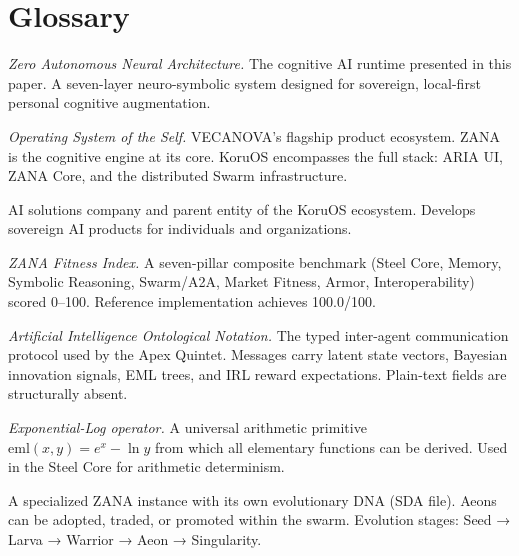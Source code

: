 \documentclass[12pt,a4paper]{article}
\begin{document}
\newpage
\section*{Glossary}

\begin{description}[leftmargin=3cm, style=nextline, font=\bfseries\color{xblue}]

  \item[ZANA]
    \emph{Zero Autonomous Neural Architecture.} The cognitive AI runtime presented
    in this paper. A seven-layer neuro-symbolic system designed for sovereign,
    local-first personal cognitive augmentation.

  \item[KoruOS]
    \emph{Operating System of the Self.} VECANOVA's flagship product ecosystem.
    ZANA is the cognitive engine at its core. KoruOS encompasses the full stack:
    ARIA UI, ZANA Core, and the distributed Swarm infrastructure.

  \item[VECANOVA]
    AI solutions company and parent entity of the KoruOS ecosystem. Develops
    sovereign AI products for individuals and organizations.

  \item[ZFI]
    \emph{ZANA Fitness Index.} A seven-pillar composite benchmark (Steel Core,
    Memory, Symbolic Reasoning, Swarm/A2A, Market Fitness, Armor,
    Interoperability) scored 0--100. Reference implementation achieves 100.0/100.

  \item[AION]
    \emph{Artificial Intelligence Ontological Notation.} The typed inter-agent
    communication protocol used by the Apex Quintet. Messages carry latent state
    vectors, Bayesian innovation signals, EML trees, and IRL reward expectations.
    Plain-text fields are structurally absent.

  \item[EML]
    \emph{Exponential-Log operator.} A universal arithmetic primitive
    $\mathrm{eml}(x,y) = e^x - \ln y$ from which all elementary functions can be
    derived. Used in the Steel Core for arithmetic determinism.

  \item[Aeon]
    A specialized ZANA instance with its own evolutionary DNA (SDA file).
    Aeons can be adopted, traded, or promoted within the swarm. Evolution
    stages: Seed → Larva → Warrior → Aeon → Singularity.


\end{description}
\end{document}
